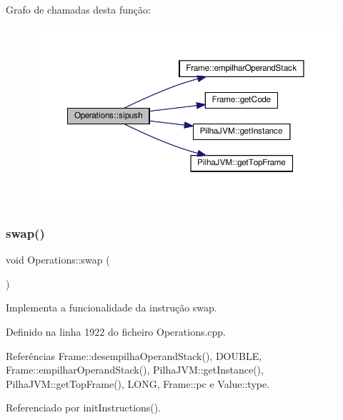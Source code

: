Grafo de chamadas desta função\+:
\nopagebreak
\begin{figure}[H]
\begin{center}
\leavevmode
\includegraphics[width=350pt]{classOperations_aed3838c73d7febfcacab9f101e6946ad_cgraph}
\end{center}
\end{figure}
\mbox{\label{classOperations_ad800d04ce11806455dd5b84a7ecd6144}} 
\subsubsection{\texorpdfstring{swap()}{swap()}}
{\footnotesize\ttfamily void Operations\+::swap (\begin{DoxyParamCaption}{ }\end{DoxyParamCaption})\hspace{0.3cm}{\ttfamily [private]}}



Implementa a funcionalidade da instrução swap. 



Definido na linha 1922 do ficheiro Operations.\+cpp.



Referências Frame\+::desempilha\+Operand\+Stack(), D\+O\+U\+B\+LE, Frame\+::empilhar\+Operand\+Stack(), Pilha\+J\+V\+M\+::get\+Instance(), Pilha\+J\+V\+M\+::get\+Top\+Frame(), L\+O\+NG, Frame\+::pc e Value\+::type.



Referenciado por init\+Instructions().

